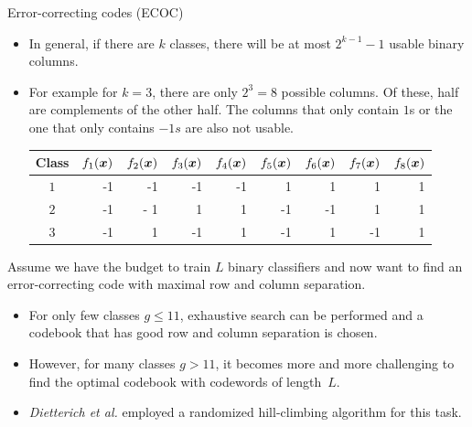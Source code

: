 \begin{vbframe}{Error-correcting codes (ECOC)}
\begin{itemize}
  \item In general, if there are $k$ classes, there will be at most $2^{k -1}- 1$ usable binary columns.  
  \item For example for $k = 3$, there are only $2^3 = 8$ possible columns. Of these, half are complements of the other half. The columns that only contain $1$s or the one that only contains $-1s$ are also not usable.
\begin{footnotesize}
  \begin{table}[]
  \begin{tabular}{|c|r|r|r|r|r|r|r|r|} \hline
  \textbf{Class}  & \textbf{$f_1{(\bm{x})}$} & \textbf{$f_2{(\bm{x})}$}  & \textbf{$f_3{(\bm{x})}$} & \textbf{$f_4{(\bm{x})}$} & \textbf{$f_5{(\bm{x})}$} & \textbf{$f_6{(\bm{x})}$} & \textbf{$f_7{(\bm{x})}$} & \textbf{$f_8{(\bm{x})}$}\\ \hline
  \textbf{$1$} & -1 & -1 & -1 & -1 & 1 & 1 & 1 & 1 \\ \hline
  \textbf{$2$} & -1 & - 1 & 1 & 1 & -1 & -1 & 1 & 1 \\ \hline
  \textbf{$3$} & -1 & 1 & -1 & 1 & -1 & 1 & -1 & 1\\ \hline
  \end{tabular}
  \end{table}
\end{footnotesize}

\end{itemize}

\framebreak 

Assume we have the budget to train $L$
 binary classifiers and now want to find an error-correcting code with maximal row and column separation. 

\begin{itemize}
  \item For only few classes $g \le 11$, exhaustive search can be performed and a codebook that has good row and column separation is chosen. 
  \item However, for many classes $g > 11$, it becomes more and more challenging to find the optimal codebook with codewords of length~$L$.
  \item \emph{Dietterich et al.} employed a randomized hill-climbing algorithm for this task. 

\end{itemize}

\end{vbframe}

